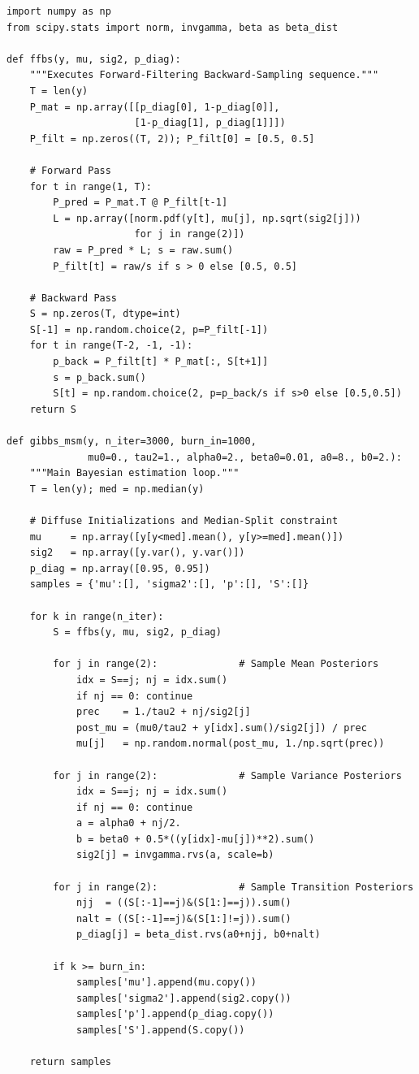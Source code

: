 \documentclass[12pt, a4paper]{article}
\begin{document}
\begin{lstlisting}[caption={Complete, validated implementation of the Gibbs Sampler for the Markov Switching Model.}, label=lst:gibbs]
import numpy as np
from scipy.stats import norm, invgamma, beta as beta_dist

def ffbs(y, mu, sig2, p_diag):
    """Executes Forward-Filtering Backward-Sampling sequence."""
    T = len(y)
    P_mat = np.array([[p_diag[0], 1-p_diag[0]],
                      [1-p_diag[1], p_diag[1]]])
    P_filt = np.zeros((T, 2)); P_filt[0] = [0.5, 0.5]
    
    # Forward Pass
    for t in range(1, T):
        P_pred = P_mat.T @ P_filt[t-1]
        L = np.array([norm.pdf(y[t], mu[j], np.sqrt(sig2[j]))
                      for j in range(2)])
        raw = P_pred * L; s = raw.sum()
        P_filt[t] = raw/s if s > 0 else [0.5, 0.5]
        
    # Backward Pass
    S = np.zeros(T, dtype=int)
    S[-1] = np.random.choice(2, p=P_filt[-1])
    for t in range(T-2, -1, -1):
        p_back = P_filt[t] * P_mat[:, S[t+1]]
        s = p_back.sum()
        S[t] = np.random.choice(2, p=p_back/s if s>0 else [0.5,0.5])
    return S

def gibbs_msm(y, n_iter=3000, burn_in=1000,
              mu0=0., tau2=1., alpha0=2., beta0=0.01, a0=8., b0=2.):
    """Main Bayesian estimation loop."""
    T = len(y); med = np.median(y)
    
    # Diffuse Initializations and Median-Split constraint
    mu     = np.array([y[y<med].mean(), y[y>=med].mean()])
    sig2   = np.array([y.var(), y.var()])
    p_diag = np.array([0.95, 0.95])
    samples = {'mu':[], 'sigma2':[], 'p':[], 'S':[]}

    for k in range(n_iter):
        S = ffbs(y, mu, sig2, p_diag)

        for j in range(2):              # Sample Mean Posteriors
            idx = S==j; nj = idx.sum()
            if nj == 0: continue
            prec    = 1./tau2 + nj/sig2[j]
            post_mu = (mu0/tau2 + y[idx].sum()/sig2[j]) / prec
            mu[j]   = np.random.normal(post_mu, 1./np.sqrt(prec))

        for j in range(2):              # Sample Variance Posteriors
            idx = S==j; nj = idx.sum()
            if nj == 0: continue
            a = alpha0 + nj/2.
            b = beta0 + 0.5*((y[idx]-mu[j])**2).sum()
            sig2[j] = invgamma.rvs(a, scale=b)

        for j in range(2):              # Sample Transition Posteriors
            njj  = ((S[:-1]==j)&(S[1:]==j)).sum()
            nalt = ((S[:-1]==j)&(S[1:]!=j)).sum()
            p_diag[j] = beta_dist.rvs(a0+njj, b0+nalt)

        if k >= burn_in:
            samples['mu'].append(mu.copy())
            samples['sigma2'].append(sig2.copy())
            samples['p'].append(p_diag.copy())
            samples['S'].append(S.copy())

    return samples
\end{lstlisting}
\end{document}
